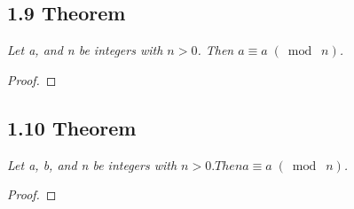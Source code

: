 \documentclass{article}
\begin{document}
\subsection*{1.9 Theorem} 
\quad \textit{Let a, and n be integers with $n > 0$. Then $a \equiv a \;(\bmod\; n)$.}

\begin{proof}
\end{proof}

\subsection*{1.10 Theorem} 
\quad \textit{Let a, b, and n be integers with $n > 0. Then a \equiv a \;(\bmod\; n)$.}

\begin{proof}
\end{proof}
\end{document}
